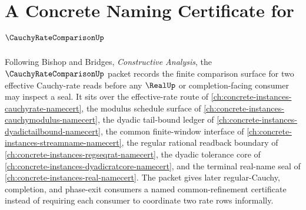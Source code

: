 \chapter{A Concrete Naming Certificate for $\CauchyRateComparisonUp$}
\label{ch:concrete-instances-cauchy-rate-comparison-namecert}

Following Bishop and Bridges, \emph{Constructive Analysis}, the $\CauchyRateComparisonUp$ packet records the finite comparison surface for two effective Cauchy-rate reads before any $\RealUp$ or completion-facing consumer may inspect a seal. It sits over the effective-rate route of \autoref{ch:concrete-instances-cauchyrate-namecert}, the modulus schedule surface of \autoref{ch:concrete-instances-cauchymodulus-namecert}, the dyadic tail-bound ledger of \autoref{ch:concrete-instances-dyadictailbound-namecert}, the common finite-window interface of \autoref{ch:concrete-instances-streamname-namecert}, the regular rational readback boundary of \autoref{ch:concrete-instances-regseqrat-namecert}, the dyadic tolerance core of \autoref{ch:concrete-instances-dyadicratcore-namecert}, and the terminal real-name seal of \autoref{ch:concrete-instances-real-namecert}. The packet gives later regular-Cauchy, completion, and phase-exit consumers a named common-refinement certificate instead of requiring each consumer to coordinate two rate rows informally.

